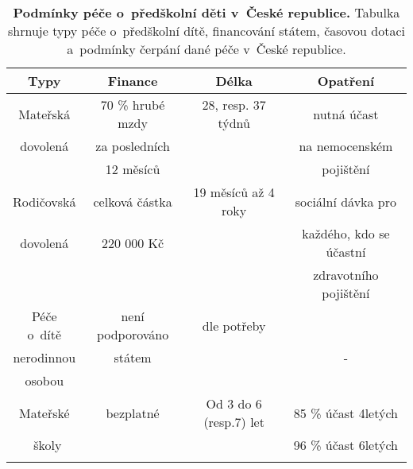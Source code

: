 \begin{spacing}{1.0}
\begin{table}[h!]
	\center
	\small
	\begin{center}
	\begin{tabular}{|c|c|c|c|}
		\hline
		\rowcolor{grey}
		\textbf{Typy}	 & \textbf{Finance}		& \textbf{Délka}		& \textbf{Opatření}	 \\
		\hline
		\hline
		Mateřská & 70 \% hrubé mzdy 		& 28, resp. 37 týdnů	& nutná účast  			\\ \rowcolor{grey!10}
		dovolená & za posledních	 		& 						& na nemocenském 		\\ \rowcolor{grey!10}
				 & 12 měsíců				& 						& pojištění				\\ \rowcolor{grey!10}
		\hline
		Rodičovská 	& celková částka  		& 19 měsíců až 4 roky	& sociální dávka pro 	\\ \rowcolor{grey!10}
		dovolená 	& 220 000 Kč			& 					& každého, kdo se účastní	\\ \rowcolor{grey!10}
					&						&						& zdravotního pojištění \\ \rowcolor{grey!10}
		\hline
		Péče o~dítě & není podporováno		& dle potřeby			&   					\\ \rowcolor{grey!10}
		nerodinnou	& státem				&						&	-					\\ \rowcolor{grey!10}
		osobou 		&						&						&						\\ \rowcolor{grey!10}
		\hline
		Mateřské	& 	bezplatné 			& Od 3 do 6 (resp.7) let & 85 \% účast 4letých 	\\ \rowcolor{grey!10}\
		školy 		& 						&  						 & 96 \% účast 6letých 	\\ \rowcolor{grey!10}
		\hline
	\end{tabular}
	\end{center}
	\caption{
		\textbf{Podmínky péče o~předškolní děti v~České republice.}
				Tabulka shrnuje typy péče o~předškolní dítě, financování státem, časovou dotaci a~podmínky čerpání dané péče v~České republice.
	}
	\label{tab:peceCR}
\end{table}
\end{spacing}	
